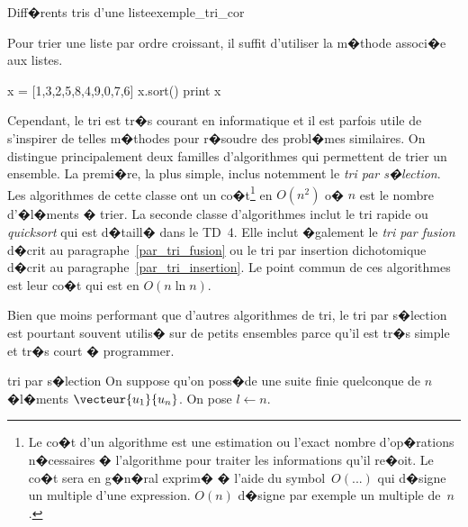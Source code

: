 %
\firstpassagedo{}
%


\begin{xexempleprog2}{Diff�rents tris d'une liste}{exemple_tri_cor}\label{exemple_tri}


Pour trier une liste par ordre croissant, il suffit d'utiliser la m�thode  associ�e aux listes.
%
\begin{verbatimx}
x = [1,3,2,5,8,4,9,0,7,6] 
x.sort()
print x
\end{verbatimx}
%
Cependant, le tri est tr�s courant en informatique et il est parfois utile de s'inspirer de telles m�thodes pour r�soudre des probl�mes similaires. On distingue principalement deux familles d'algorithmes qui permettent de trier un ensemble. La premi�re, la plus simple, inclus notemment le \emph{tri par s�lection}. Les algorithmes de cette classe ont un co�t\footnote{Le co�t d'un algorithme est une estimation ou l'exact nombre d'op�rations n�cessaires � l'algorithme pour traiter les informations qu'il re�oit. Le co�t sera en g�n�ral exprim� � l'aide du symbol~$O(...)$  qui d�signe un multiple d'une expression. $O(n)$ d�signe par exemple un multiple de~$n$.} en $O(n^2)$ o� $n$ est le nombre d'�l�ments � trier. La seconde classe d'algorithmes inclut le tri rapide ou \emph{quicksort} qui est d�taill� dans le TD~4. Elle inclut �galement le \emph{tri par fusion} d�crit au paragraphe~\ref{par_tri_fusion} ou le tri par insertion dichotomique d�crit au paragraphe~\ref{par_tri_insertion}. Le point commun de ces algorithmes est leur co�t qui est en $O(n \ln n)$.




Bien que moins performant que d'autres algorithmes de tri, le tri par s�lection est pourtant souvent utilis� sur de petits ensembles parce qu'il est tr�s simple et tr�s court � programmer.


            \begin{xalgorithm}{tri par s�lection}\label{algo_tri_selection}
            On suppose qu'on poss�de une suite finie quelconque de $n$ �l�ments $\vecteur{u_1}{u_n}$. 
            On pose $l \longleftarrow n$.
            

\end{xalgorithm}
\end{xexempleprog2}
